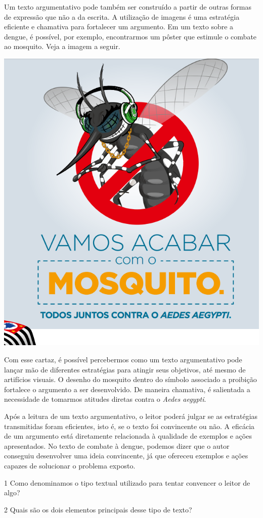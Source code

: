 {Um texto argumentativo pode também ser construído a partir de outras
formas de expressão que não a da escrita. A utilização de imagens é uma
estratégia eficiente e chamativa para fortalecer um argumento. Em um
texto sobre a dengue, é possível, por exemplo, encontrarmos um pôster
que estimule o combate ao mosquito. Veja a imagem a seguir.

\includegraphics[width=.5\textwidth]{./imgs/img11.png}

Com esse cartaz, é possível percebermos como um texto argumentativo pode lançar mão de
diferentes estratégias para atingir seus objetivos, até mesmo de
artifícios visuais. O desenho do mosquito dentro do
símbolo associado a proibição fortalece o argumento a ser desenvolvido.
De maneira chamativa, é salientada a necessidade de tomarmos atitudes diretas contra o
\textit{Aedes aegypti}.

Após a leitura de um texto argumentativo, o leitor poderá julgar se as
estratégias transmitidas foram eficientes, isto é, se o texto foi
convincente ou não. A eficácia de um argumento está diretamente
relacionada à qualidade de exemplos e ações apresentados. No texto de
combate à dengue, podemos dizer que o autor conseguiu desenvolver uma
ideia convincente, já que ofereceu exemplos e ações capazes de
solucionar o problema exposto.}


\num{1} Como denominamos o tipo textual utilizado para tentar convencer o leitor
de algo?



\num{2} Quais são os dois elementos principais desse tipo de texto?




